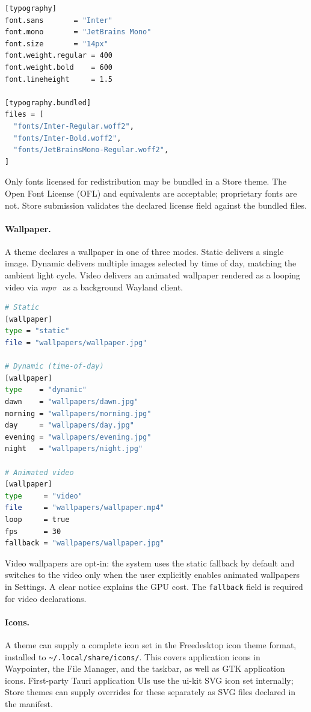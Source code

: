 \begin{lstlisting}[language=bash, caption={Typography token declaration}]
[typography]
font.sans       = "Inter"
font.mono       = "JetBrains Mono"
font.size       = "14px"
font.weight.regular = 400
font.weight.bold    = 600
font.lineheight     = 1.5

[typography.bundled]
files = [
  "fonts/Inter-Regular.woff2",
  "fonts/Inter-Bold.woff2",
  "fonts/JetBrainsMono-Regular.woff2",
]
\end{lstlisting}

Only fonts licensed for redistribution may be bundled in a Store theme. The
Open Font License (OFL) and equivalents are acceptable; proprietary fonts are
not. Store submission validates the declared license field against the bundled
files.

\paragraph{Wallpaper.}
A theme declares a wallpaper in one of three modes. Static delivers a single
image. Dynamic delivers multiple images selected by time of day, matching the
ambient light cycle. Video delivers an animated wallpaper rendered as a
looping video via \emph{mpv}~\cite{mpv} as a background Wayland client.

\begin{lstlisting}[language=bash, caption={Wallpaper declaration}]
# Static
[wallpaper]
type = "static"
file = "wallpapers/wallpaper.jpg"

# Dynamic (time-of-day)
[wallpaper]
type    = "dynamic"
dawn    = "wallpapers/dawn.jpg"
morning = "wallpapers/morning.jpg"
day     = "wallpapers/day.jpg"
evening = "wallpapers/evening.jpg"
night   = "wallpapers/night.jpg"

# Animated video
[wallpaper]
type     = "video"
file     = "wallpapers/wallpaper.mp4"
loop     = true
fps      = 30
fallback = "wallpapers/wallpaper.jpg"
\end{lstlisting}

Video wallpapers are opt-in: the system uses the static fallback by default
and switches to the video only when the user explicitly enables animated
wallpapers in Settings. A clear notice explains the GPU cost. The
\texttt{fallback} field is required for video declarations.

\paragraph{Icons.}
A theme can supply a complete icon set in the Freedesktop icon theme format,
installed to \texttt{\textasciitilde/.local/share/icons/}. This covers
application icons in Waypointer, the File Manager, and the taskbar, as well
as GTK application icons. First-party Tauri application UIs use the ui-kit
SVG icon set internally; Store themes can supply overrides for these
separately as SVG files declared in the manifest.


